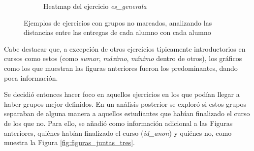 \documentclass[11pt,a4paper,twoside,openany]{tesis}
\begin{document}
\begin{figure}[H]
\begin{subfigure}{0.45\textwidth}
        \caption{Heatmap del ejercicio \emph{es\_generala}}
        \label{fig:figura2}
    \end{subfigure}
    \caption{Ejemplos de ejercicios con grupos no marcados, analizando las distancias entre las entregas de cada alumno con cada alumno}
    \label{fig:figuras_juntas_dos}
\end{figure}



Cabe destacar que, a excepción de otros ejercicios típicamente introductorios en cursos como estos (como \emph{sumar}, \emph{máximo}, \emph{mínimo} dentro de otros), los gráficos como los que muestran las figuras anteriores fueron los predominantes, dando poca información. 

Se decidió entonces hacer foco en aquellos ejercicios en los que podían llegar a haber grupos mejor definidos. En un análisis posterior se exploró si estos grupos separaban de alguna manera a aquellos estudiantes que habían finalizado el curso de los que no. Para ello, se añadió como información adicional a las Figuras anteriores, quiénes habían finalizado el curso (\emph{id\_anon}) y quiénes no, como muestra la Figura  \ref{fig:figuras_juntas_tres}.
\end{document}
